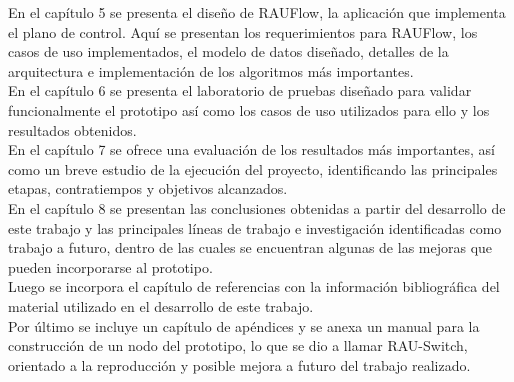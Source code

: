 En el cap\'itulo 5 se presenta el diseño de RAUFlow, la aplicaci\'on que implementa el plano de control. Aquí se presentan los requerimientos para RAUFlow, los casos de uso implementados, el modelo de datos diseñado, detalles de la arquitectura e implementaci\'on de los algoritmos m\'as importantes.\\

En el cap\'itulo 6 se presenta el laboratorio de pruebas diseñado para validar funcionalmente el prototipo as\'i como los casos de uso utilizados para ello y los resultados obtenidos.\\

En el cap\'itulo 7 se ofrece una evaluación de los resultados m\'as importantes, así como un breve estudio de la ejecuci\'on del proyecto, identificando las principales etapas, contratiempos y objetivos alcanzados.\\

En el cap\'itulo 8 se presentan las conclusiones obtenidas a partir del desarrollo de este trabajo y las principales l\'ineas de trabajo e investigaci\'on identificadas como trabajo a futuro, dentro de las cuales se encuentran algunas de las mejoras que pueden incorporarse al prototipo.\\

Luego se incorpora el cap\'itulo de referencias con la informaci\'on bibliográfica del material utilizado en el desarrollo de este trabajo.\\

Por \'ultimo se incluye un cap\'itulo de ap\'endices y se anexa un manual para la construcci\'on de un nodo del prototipo, lo que se dio a llamar RAU-Switch, orientado a la reproducci\'on y posible mejora a futuro del trabajo realizado.



 
